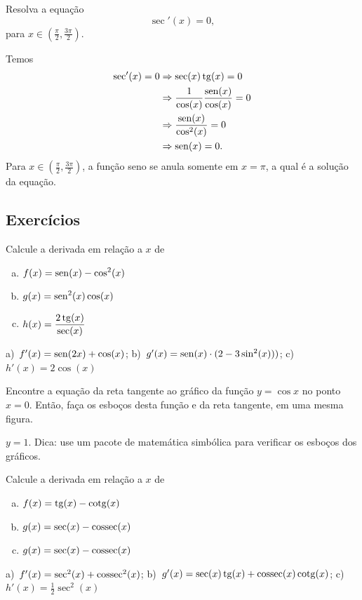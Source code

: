 \begin{exeresol}
  Resolva a equação
  \begin{equation}
    \sec'(x) = 0,
  \end{equation}
  para $x\in \left(\frac{\pi}{2}, \frac{3\pi}{2}\right)$.
\end{exeresol}
\begin{resol}
  Temos
  \begin{align}
    \sec'(x) = 0 &\Rightarrow \sec(x)\operatorname{tg}(x) = 0 \\
                 &\Rightarrow \frac{1}{\cos(x)}\frac{\operatorname{sen}(x)}{\cos(x)} = 0 \\
                 &\Rightarrow \frac{\operatorname{sen}(x)}{\cos^2(x)} = 0 \\
                 &\Rightarrow \operatorname{sen}(x) = 0.
  \end{align}
  Para $x\in \left(\frac{\pi}{2}, \frac{3\pi}{2}\right)$, a função seno se anula somente em $x=\pi$, a qual é a solução da equação.
\end{resol}


\subsection*{Exercícios}

\begin{exer}
  Calcule a derivada em relação a $x$ de
  \begin{enumerate}[a)]
  \item $\displaystyle f(x)=\operatorname{sen}(x)-\cos^2(x)$
  \item $\displaystyle g(x)=\operatorname{sen}^2(x)\cos(x)$
  \item $\displaystyle h(x)=\frac{2\operatorname{tg}(x)}{\sec(x)}$
  \end{enumerate}
\end{exer}
\begin{resp}
  a)~$f'(x)=\operatorname{sen}(2x)+\cos(x)$; b)~$g'(x)=\operatorname{sen}(x)\cdot(2-3\sin^2(x)))$; c)~$h'(x)=2\cos(x)$
\end{resp}

\begin{exer}
  Encontre a equação da reta tangente ao gráfico da função $y = \cos x$ no ponto $x=0$. Então, faça os esboços desta função e da reta tangente, em uma mesma figura.  
\end{exer}
\begin{resp}
  $y = 1$. Dica: use um pacote de matemática simbólica para verificar os esboços dos gráficos.
\end{resp}

\begin{exer}
  Calcule a derivada em relação a $x$ de
  \begin{enumerate}[a)]
  \item $\displaystyle f(x)=\operatorname{tg}(x)-\operatorname{cotg}(x)$
  \item $\displaystyle g(x)=\sec(x)-\operatorname{cossec}(x)$
  \item $\displaystyle g(x)=\sec(x)-\operatorname{cossec}(x)$
  \end{enumerate}
\end{exer}
\begin{resp}
  a)~$f'(x)=\sec^2(x)+\operatorname{cossec}^2(x)$; b)~$g'(x)=\sec(x)\operatorname{tg}(x)+\operatorname{cossec}(x)\operatorname{cotg}(x)$; c)~$h'(x)=\frac{1}{2}\sec^2(x)$
\end{resp}


